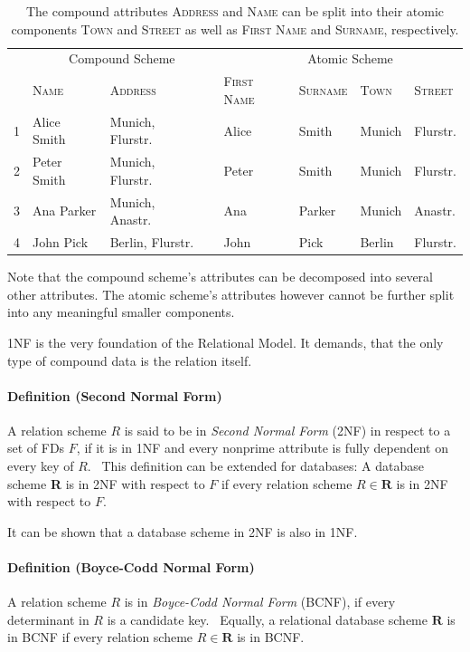 \begin{table}[ht]
    \centering
    \begin{tabular}{rlllllll}
        \toprule
        \toprule
    & \multicolumn{3}{c}{Compound Scheme} & & \multicolumn{2}{c}{Atomic Scheme} \\
    \cmidrule{2-3} \cmidrule{5-8}
    & \textsc{Name} & \textsc{Address} && \textsc{First Name} & \textsc{Surname} & \textsc{Town} & \textsc{Street}   \\ \midrule
1 & Alice Smith & Munich, Flurstr. && Alice & Smith & Munich & Flurstr. \\
2 & Peter Smith & Munich, Flurstr. && Peter & Smith & Munich & Flurstr. \\
3 & Ana Parker & Munich, Anastr. && Ana & Parker & Munich & Anastr. \\
4 & John Pick & Berlin, Flurstr. && John & Pick & Berlin & Flurstr. \\
\bottomrule
\bottomrule
\end{tabular}
\caption{The compound attributes \textsc{Address} and \textsc{Name} can be split into their atomic components \textsc{Town} and \textsc{Street} as well as \textsc{First Name} and \textsc{Surname}, respectively.}\label{tab:first-normal-form}
\end{table}
Note that the compound scheme's attributes can be decomposed into several other attributes.
The atomic scheme's attributes however cannot be further split into any meaningful smaller components.

1NF is the very foundation of the Relational Model. It demands, that the only type of compound data is the relation itself.~\cite[p.~6]{COD90}

\paragraph{Definition (Second Normal Form)} A relation scheme \(R\) is said to be in \emph{Second Normal Form} (2NF) in respect to a set of FDs \(F\), if it is in 1NF and every nonprime attribute is fully dependent on every key of \(R\).~\cite[p.~99]{MAI83}
This definition can be extended for databases: A database scheme \textbf{R} is in 2NF with respect to \(F\) if every relation scheme \(R \in \textbf{R} \) is in 2NF with respect to \(F\).

It can be shown that a database scheme in 2NF is also in 1NF.~\cite[p.~58]{SCH17}

\paragraph{Definition (Boyce-Codd Normal Form)}
A relation scheme \( R \) is in \emph{Boyce-Codd Normal Form} (BCNF), if every determinant in \( R \) is a candidate key.~\cite[p.~65]{SCH17}
Equally, a relational database scheme \( \textbf{R} \) is in BCNF if every relation scheme \( R \in \textbf{R} \) is in BCNF.\

